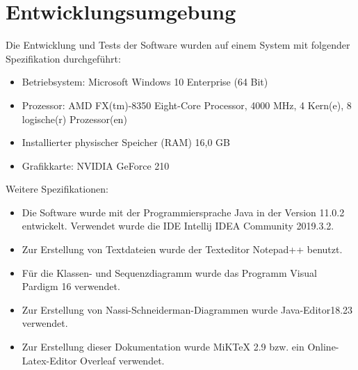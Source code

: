 %

\chapter{Entwicklungsumgebung}
\label{chap:Env}

Die Entwicklung und Tests der Software wurden auf einem System mit folgender Spezifikation durchgeführt:
\begin{itemize}
\item Betriebsystem: Microsoft Windows 10 Enterprise (64 Bit)
\item  Prozessor: AMD FX(tm)-8350 Eight-Core Processor, 4000 MHz, 4 Kern(e), 8 logische(r) Prozessor(en)
\item Installierter physischer Speicher (RAM) 16,0 GB
\item Grafikkarte: NVIDIA GeForce 210
\end{itemize}

Weitere Spezifikationen:
\begin{itemize}
\item Die Software wurde mit der Programmiersprache Java in der Version 11.0.2 entwickelt. Verwendet wurde die IDE Intellij IDEA Community 2019.3.2.
\item Zur Erstellung von Textdateien wurde der Texteditor Notepad++ benutzt.
\item Für die Klassen- und Sequenzdiagramm wurde das Programm Visual Pardigm 16 verwendet.
\item Zur Erstellung von Nassi-Schneiderman-Diagrammen wurde Java-Editor18.23 verwendet.
\item Zur Erstellung dieser Dokumentation wurde MiKTeX 2.9 bzw. ein Online-Latex-Editor Overleaf verwendet.
\end{itemize}